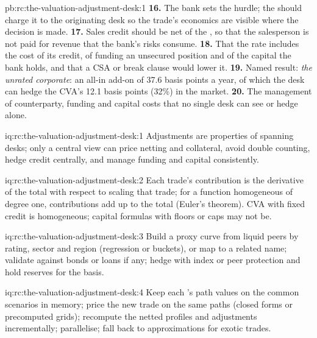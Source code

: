 \begin{solution}{pb:rc:the-valuation-adjustment-desk:1}
\textbf{16.} The bank sets the hurdle; the  should charge it to the originating desk so
the trade's economics are visible where the decision is made.
\textbf{17.} Sales credit should be net of the , so that the salesperson is not paid for
revenue that the bank's risks consume.
\textbf{18.} That the rate includes the cost of its credit, of funding an unsecured position and
of the capital the bank holds, and that a CSA or break clause would lower it.
\textbf{19.} Named result: \emph{the unrated corporate}: an all-in add-on of 37.6 basis points a
year, of which the desk can hedge the CVA's 12.1 basis points (32\%) in the market.
\textbf{20.} The management of counterparty, funding and capital costs that no single desk can
see or hedge alone.
\end{solution}

\begin{solution}{iq:rc:the-valuation-adjustment-desk:1}
Adjustments are properties of  spanning desks; only a central view can price
netting and collateral, avoid double counting, hedge credit centrally, and manage funding and
capital consistently.
\end{solution}

\begin{solution}{iq:rc:the-valuation-adjustment-desk:2}
Each trade's contribution is the derivative of the total with respect to scaling that trade;
for a function homogeneous of degree one, contributions add up to the total (Euler's theorem).
CVA with fixed credit is homogeneous; capital formulas with floors or caps may not be.
\end{solution}

\begin{solution}{iq:rc:the-valuation-adjustment-desk:3}
Build a proxy curve from liquid peers by rating, sector and region (regression or buckets), or
map to a related name; validate against bonds or loans if any; hedge with index or peer
protection and hold reserves for the basis.
\end{solution}

\begin{solution}{iq:rc:the-valuation-adjustment-desk:4}
Keep each 's path values on the common scenarios in memory; price the new trade on
the same paths (closed forms or precomputed grids); recompute the netted profiles and
adjustments incrementally; parallelise; fall back to approximations for exotic trades.
\end{solution}

